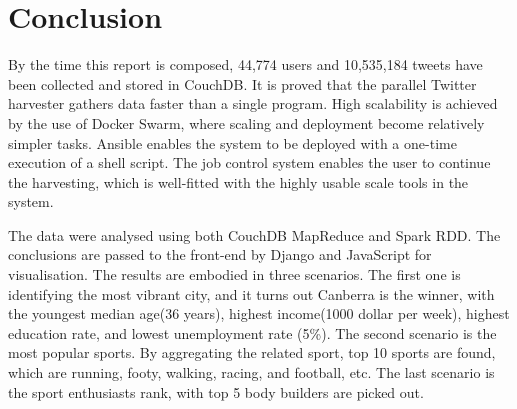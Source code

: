 \section{Conclusion}

By the time this report is composed, 44,774 users and 10,535,184 tweets have been collected and stored in CouchDB. It is proved that the parallel Twitter harvester gathers data faster than a single program. High scalability is achieved by the use of Docker Swarm, where scaling and deployment become relatively simpler tasks. Ansible enables the system to be deployed with a one-time execution of a shell script. The job control system enables the user to continue the harvesting, which is well-fitted with the highly usable scale tools in the system. 

The data were analysed using both CouchDB MapReduce and Spark RDD. The conclusions are passed to the front-end by Django and JavaScript for visualisation. The results are embodied in three scenarios. The first one is identifying the most vibrant city, and it turns out Canberra is the winner, with the youngest median age(36 years), highest income(1000 dollar per week), highest education rate, and lowest unemployment rate (5\%). The second scenario is the most popular sports. By aggregating the related sport, top 10 sports are found, which are running, footy, walking, racing, and football, etc. The last scenario is the sport enthusiasts rank, with top 5 body builders are picked out. 